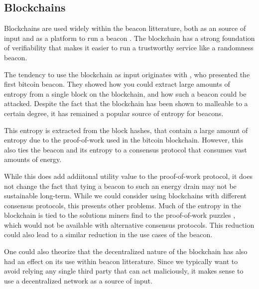 \subsection{Blockchains}
Blockchains are used widely within the beacon litterature, both as an source of input \cite{bonneau2015bitcoin, bentov2016bitcoin, bunz2017proofsof} and as a platform to run a beacon \cite{randao, bunz2017proofsof}. The blockchain has a strong foundation of verifiability that makes it easier to run a trustworthy service like a randomness beacon. 

The tendency to use the blockchain as input originates with \citet{bonneau2015bitcoin}, who presented the first bitcoin beacon. They showed how you could extract large amounts of entropy from a single block on the blockchain, and how such a beacon could be attacked. 
Despite the fact that the blockchain has been shown to malleable to a certain degree\cite{pierrot2016malleability}, it has remained a popular source of entropy for beacons. 

This entropy is extracted from the block hashes, that contain a large amount of entropy due to the proof-of-work used in the bitcoin blockchain. However, this also ties the beacon and its entropy to a consensus protocol that consumes vast amounts of energy\cite{bitcoinenergy}. 

While this does add addiitonal utility value to the proof-of-work protocol, it does not change the fact that tying a beacon to such an energy drain may not be sustainable long-term. While we could consider using blockchains with different consensus protocols, this presents other problems. Much of the entropy in the blockchain is tied to the solutions miners find to the proof-of-work puzzles \cite{bonneau2015bitcoin}, which would not be available with alternative consensus protocols. This reduction could also lead to a similar reduction in the use cases of the beacon. 

One could also theorize that the decentralized nature of the blockchain has also had an effect on its use within beacon litterature. Since we typically want to avoid relying any single third party that can act maliciously, it makes sense to use a decentralized network as a source of input. 

